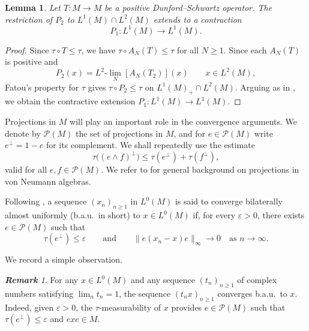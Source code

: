 \documentclass[12pt]{amsart}
\renewcommand{\P}{\mbox{${\mathcal P}$}}
\newtheorem{lemma}[theorem]{Lemma}
\theoremstyle{remark}
\newtheorem{remark}[theorem]{\bf Remark}
\theoremstyle{definition}
\numberwithin{equation}{section}
\begin{document}
\begin{lemma}\label{2Gamma1}
Let $T\colon M\to M$ be a positive 
Dunford--Schwartz operator. The restriction of 
$P_2$ to $L^1(M)\cap L^2(M)$
extends to a contraction 
$$
P_1\colon L^1(M)\longrightarrow L^1(M).
$$
\end{lemma}

\begin{proof}
Since $\tau\circ T\leq \tau$, we have
$\tau\circ A_N(T)\leq\tau$ for all $N\geq1$. Since each $A_N(T)$ is
positive and
\[
P_2(x)=L^2\text{-}\lim_N[A_N(T_2)](x)
\qquad x\in L^2(M),
\]
Fatou's property for $\tau$ gives \(\tau\circ P_2\leq\tau\)
on $L^1(M)_+\cap L^2(M)$. Arguing as in
\cite[Lemma 1.1]{JX}, we obtain the contractive extension
$P_1\colon L^1(M)\to L^1(M)$.
\end{proof}

Projections in $M$ will play an important role in the convergence
arguments. We denote by $\P(M)$ the set of projections in $M$, and for
$e\in\P(M)$ write
$e^\perp=1-e$ for its complement. We shall repeatedly use the estimate
\begin{equation}\label{2Tr}
\tau\bigl((e\wedge f)^\perp\bigr)
\leq \tau(e^\perp)+\tau(f^\perp),
\end{equation}
valid for all $e,f\in\P(M)$. We refer to
\cite[Section 5.1]{Tak} for general background on projections in von
Neumann algebras.

Following \cite[Definition 6.1]{JX}, a sequence
$(x_n)_{n\geq1}$ in $L^0(M)$ is said to converge bilaterally almost
uniformly (b.a.u.\ in short) to $x\in L^0(M)$ if, for every $\varepsilon>0$, there
exists $e\in\P(M)$ such that
$$
\tau(e^\perp)\leq\varepsilon
\qquad\text{and}\qquad
\|e(x_n-x)e\|_\infty\longrightarrow0
\quad\text{as }n\to\infty.
$$

We record a simple observation.


\begin{remark}\label{2tn}
For any $x\in L^{0}(M)$ and any sequence $(t_n)_{n\geq1}$ of complex
numbers satisfying $\lim_n t_n=1$, the sequence $(t_nx)_{n\geq1}$
converges b.a.u.\ to $x$. Indeed, given $\varepsilon>0$, the
$\tau$-measurability of $x$ provides $e\in\P(M)$ such that
$\tau(e^\perp)\leq\varepsilon$ and $exe\in M$.
\end{remark}
\end{document}
